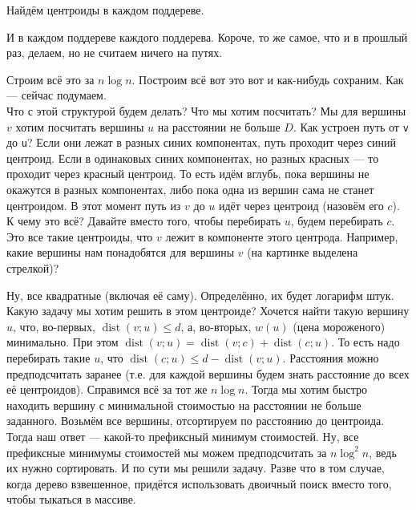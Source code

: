 \documentclass{article}
\newcommand{\pseudo}{PseudoLexer.py:PseudoLexer -x}
\newcommand{\pseudocode}[1]{\texttt{#1}}
\begin{document}
    Найдём центроиды в каждом поддереве.
    \begin{figure}[H]
        
    \end{figure}\noindent
    И в каждом поддереве каждого поддерева. Короче, то же самое, что и в прошлый раз, делаем, но не считаем ничего на путях.
    \begin{figure}[H]
        
    \end{figure}\noindent
    Строим всё это за $n\log n$. Построим всё вот это вот и как-нибудь сохраним. Как --- сейчас подумаем.\\
    Что с этой структурой будем делать? Что мы хотим посчитать? Мы для вершины $v$ хотим посчитать вершины $u$ на расстоянии не больше $D$. Как устроен путь от \pseudocode{v} до \pseudocode{u}? Если они лежат в разных синих компонентах, путь проходит через синий центроид. Если в одинаковых синих компонентах, но разных красных --- то проходит через красный центроид. То есть идём вглубь, пока вершины не окажутся в разных компонентах, либо пока одна из вершин сама не станет центроидом. В этот момент путь из $v$ до $u$ идёт через центроид (назовём его $c$).\\
    К чему это всё? Давайте вместо того, чтобы перебирать $u$, будем перебирать $c$. Это все такие центроиды, что $v$ лежит в компоненте этого центрода. Например, какие вершины нам понадобятся для вершины $v$ (на картинке выделена стрелкой)?
    \begin{figure}[H]
        
    \end{figure}\noindent
    Ну, все квадратные (включая её саму). Определённо, их будет логарифм штук. Какую задачу мы хотим решить в этом центроиде? Хочется найти такую вершину $u$, что, во-первых, $\operatorname{dist}(v;u)\leqslant d$, а, во-вторых, $w(u)$ (цена мороженого) минимально. При этом $\operatorname{dist}(v;u)=\operatorname{dist}(v;c)+\operatorname{dist}(c;u)$. То есть надо перебирать такие $u$, что $\operatorname{dist}(c;u)\leqslant d-\operatorname{dist}(v;u)$. Расстояния можно предподсчитать заранее (т.е. для каждой вершины будем знать расстояние до всех её центроидов). Справимся всё за тот же $n\log n$. Тогда мы хотим быстро находить вершину с минимальной стоимостью на расстоянии не больше заданного. Возьмём все вершины, отсортируем по расстоянию до центроида. Тогда наш ответ --- какой-то префиксный минимум стоимостей. Ну, все префиксные минимумы стоимостей мы можем предподсчитать за $n\log^2n$, ведь их нужно сортировать. И по сути мы решили задачу. Разве что в том случае, когда дерево взвешенное, придётся использовать двоичный поиск вместо того, чтобы тыкаться в массиве.\\
\end{document}
